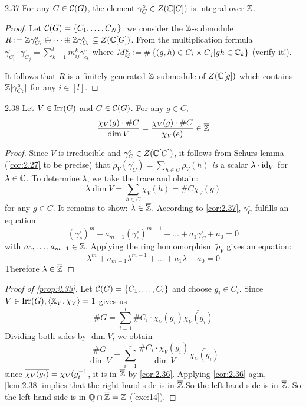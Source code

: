 \documentclass[twoside = false,	%
		headsepline,		%
		parskip = true,
		]{scrbook}						%
\begin{document}
    \begin{corollary}{}{2.37}
        For any $C\in\mathcal C(G)$, the element $\gamma_C^\circ\in Z(\mathbb C[G])$ is integral over $\mathbb Z$.
    \end{corollary}

    \begin{proof}
        Let $\mathcal C(G)=\left\{ C_1,\dots,C_N\right\}$. we consider the $\mathbb Z$-submodule $R:=\mathbb Z\gamma_{C_1}^\circ\oplus\dots\oplus\mathbb Z\gamma_{C_l}^\circ\subseteq Z(\mathbb C[G])$. From the multiplication formula $\gamma_{C_i}^\circ\cdot\gamma_{C_j}^\circ=\sum_{k=1}^lm_{ij}^k\gamma^\circ_{c_k}$ where $M_{ij}^k:=\#\left\{ (g,h)\in C_i\times C_j| gh\in \mathbb C_k\right\}$ (verify it!).

        It follows that $R$ is a finitely generated $\mathbb Z$-submodule of $Z(\mathbb C[g])$ which contains $\mathbb Z[\gamma_{C_i}^\circ]$ for any $i\in [l]$.
    \end{proof}
    
    \begin{lemma}{}{2.38}
        Let $V\in\mathrm{Irr}(G)$ and $C\in\mathcal C(G)$. For any $g\in C$, 
        $$\frac{\chi_V(g)\cdot\#C}{\dim V}=\frac{\chi_V(g)\cdot\#C}{\chi_V(e)}\in\overline{\mathbb Z}$$
        
    \end{lemma}
    
    \begin{proof}
        Since $V$ is irreducible and $\gamma_C^\circ\in Z(\mathbb C[G])$, it follows from Schurs lemma (\ref{cor:2.27} to be precise) that $\tilde\rho_V(\gamma^\circ_C)=\sum_{h\in C}\rho_V(h)$ \textit{is} a scalar $\lambda\cdot \mathrm{id}_V$ for $\lambda\in\mathbb C$. To determine $\lambda$, we take the trace and obtain:
        $$\lambda\dim V=\sum_{h\in C}\chi_V(h)=\#C\chi_V(g)$$ for any $g\in C$. It remains to show: $\lambda \in\overline {\mathbb Z}$.
        According to \ref{cor:2.37}, $\gamma_C^\circ$ fulfills an equation
        $$(\gamma_c^\circ)^m+a_{m-1}(\gamma_c^\circ)^{m-1}+\dots+ a_1\gamma_C^\circ+a_0=0$$
        with $a_0,\dots,a_{m-1}\in\mathbb Z$. Applying the ring homomorphism $\tilde\rho_V$ gives an equation:
        $$\lambda^m+a_{m-1}\lambda^{m-1}+\dots+a_1\lambda+a_0=0$$
        Therefore $\lambda\in\overline{\mathbb Z}$
    \end{proof}

    \begin{proof}[Proof of \ref{prop:2.33}]
        Let $\mathcal C(G)=\left\{ C_1,\dots,C_l\right\}$ and choose $g_i\in C_i$. Since $V\in\mathrm{Irr}(G), \left\langle \mathbb X_V,\chi_V\right\rangle=1$ gives us $$\#G=\sum_{i=1}^l\#C_i\cdot \chi_V(g_i)\bar{\chi_V(g_i)}$$
        Dividing both sides by $\dim V$, we obtain $$\frac{\#G}{\dim V}=\sum_{i=1}^r\frac{\# C_i\cdot\chi_V(g_i)}{\dim V}\bar{\chi_V(g_i)}$$
        since $\overline{\chi_V(g_i)}=\chi_V(g_i^{-1}$, it is in $\overline {\mathbb Z}$ by \ref{cor:2.36}.
        Applying \ref{cor:2.36} agin, \ref{lem:2.38} implies that the right-hand side is in $\overline {\mathbb Z}$.So the left-hand side is in $\overline{\mathbb Z}$. So the left-hand side is in $\mathbb Q\cap\overline{\mathbb Z}=\mathbb Z$ (\ref{exe:14}).
    \end{proof}
    
\end{document}

